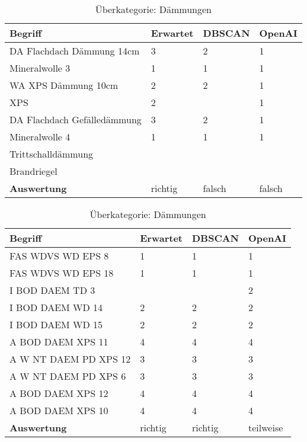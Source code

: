 \begin{table}[h]
	
	\centering
	\begin{tabular}{|l|l|l|l|}
		\hline
		\textbf{Begriff} & \textbf{Erwartet} & \textbf{DBSCAN} & \textbf{OpenAI}\\ \hline
		   DA Flachdach Dämmung 14cm & 3 & 2 & 1 \\ \hline
		Mineralwolle 3 & 1 & 1 & 1 \\ \hline
		WA XPS Dämmung 10cm & 2 & 2 & 1 \\ \hline
		XPS & 2 & ~ & 1 \\ \hline
		DA Flachdach Gefälledämmung & 3 & 2 & 1 \\ \hline
		Mineralwolle 4 & 1 & 1 & 1 \\ \hline
		Trittschalldämmung & ~ & ~ & ~ \\ \hline
		Brandriegel  & ~ & ~ & ~ \\ \hline
		\textbf{Auswertung} & richtig & falsch & falsch \\ \hline
	\end{tabular}
	\caption{Überkategorie: Dämmungen}
	\label{t:evaluation-example14}
\end{table}

\begin{table}[h]
	
	\centering
	\begin{tabular}{|l|l|l|l|}
		\hline
		\textbf{Begriff} & \textbf{Erwartet} & \textbf{DBSCAN} & \textbf{OpenAI}\\ \hline
		  FAS WDVS WD EPS 8 & 1 & 1 & 1 \\ \hline
		FAS WDVS WD EPS 18 & 1 & 1 & 1 \\ \hline
		I BOD DAEM TD 3 & ~ & ~ & 2 \\ \hline
		I BOD DAEM WD 14 & 2 & 2 & 2 \\ \hline
		I BOD DAEM WD 15 & 2 & 2 & 2 \\ \hline
		A BOD DAEM XPS 11 & 4 & 4 & 4 \\ \hline
		A W NT DAEM PD XPS 12 & 3 & 3 & 3 \\ \hline
		A W NT DAEM PD XPS 6 & 3 & 3 & 3 \\ \hline
		A BOD DAEM XPS 12 & 4 & 4 & 4 \\ \hline
		A BOD DAEM XPS 10 & 4 & 4 & 4 \\ \hline
		\textbf{Auswertung} & richtig & richtig & teilweise \\ \hline
	\end{tabular}
	\caption{Überkategorie: Dämmungen}
	\label{t:evaluation-example15}
\end{table}

